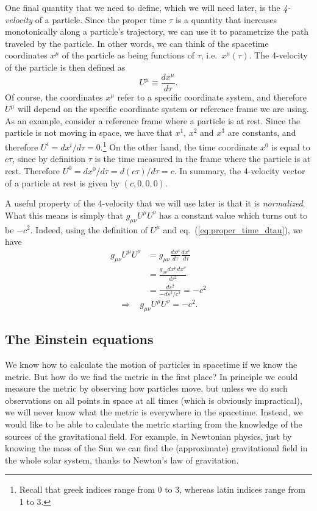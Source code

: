 One final quantity that we need to define, which we will need later, is the {\it 4-velocity} of a particle. Since the proper time $\tau$ is a quantity that increases monotonically along a particle's trajectory, we can use it to parametrize the path traveled by the particle. In other words, we can think of the spacetime coordinates $x^{\mu}$ of the particle as being functions of $\tau$, i.e.\ $x^{\mu}(\tau)$. The 4-velocity of the particle is then defined as
\begin{equation}
U^{\mu}\equiv \frac{dx^{\mu}}{d\tau}.
\end{equation}
Of course, the coordinates $x^{\mu}$ refer to a specific coordinate system, and therefore $U^{\mu}$ will depend on the specific coordinate system or reference frame we are using. As an example, consider a reference frame where a particle is at rest. Since the particle is not moving in space, we have that $x^1$, $x^2$ and $x^3$ are constants, and therefore $U^i=dx^i/d\tau=0$.\footnote{Recall that greek indices range from 0 to 3, whereas latin indices range from 1 to 3.} On the other hand, the time coordinate $x^0$ is equal to $c\tau$, since by definition $\tau$ is the time measured in the frame where the particle is at rest. Therefore $U^0=dx^0/d\tau=d(c\tau)/d\tau=c$. In summary, the 4-velocity vector of a particle at rest is given by $(c,0,0,0)$.

A useful property of the 4-velocity that we will use later is that it is {\it normalized}. What this means is simply that $g_{\mu\nu}U^{\mu}U^{\nu}$ has a constant value which turns out to be $-c^2$. Indeed, using the definition of $U^{\mu}$ and eq.\ (\ref{eq:proper_time_dtau}), we have
\begin{equation}
\begin{split}
g_{\mu\nu}U^{\mu}U^{\nu}&=g_{\mu\nu}\frac{dx^{\mu}}{d\tau}\frac{dx^{\nu}}{d\tau}\\
&=\frac{g_{\mu\nu}dx^{\mu}dx^{\nu}}{d\tau^2}\\
&=\frac{ds^2}{-ds^2/c^2}=-c^2
\end{split}
\end{equation}
\begin{equation}
\Rightarrow~~~~g_{\mu\nu}U^{\mu}U^{\nu}=-c^2.
\end{equation}


\subsection{The Einstein equations}

We know how to calculate the motion of particles in spacetime if we know the metric. But how do we find the metric in the first place? In principle we could measure the metric by observing how particles move, but unless we do such observations on all points in space at all times (which is obviously impractical), we will never know what the metric is everywhere in the spacetime. Instead, we would like to be able to calculate the metric starting from the knowledge of the sources of the gravitational field. For example, in Newtonian physics, just by knowing the mass of the Sun we can find the (approximate) gravitational field in the whole solar system, thanks to Newton's law of gravitation.

